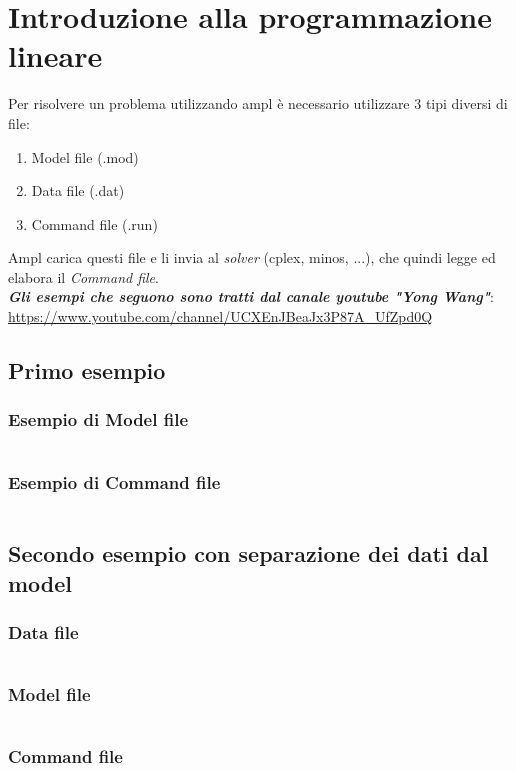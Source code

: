 \documentclass[\main/main.tex]{subfiles}
\begin{document}
%

\section{Introduzione alla programmazione lineare}
Per risolvere un problema utilizzando ampl è necessario utilizzare 3 tipi diversi di file:

\begin{enumerate}
\item Model file (.mod)
\item Data file (.dat)
\item Command file (.run)
\end{enumerate}

Ampl carica questi file e li invia al \textit{solver} (cplex, minos, ...), che quindi legge ed elabora il \textit{Command file}.
\\

\vspace{1em}
\textbf{\textit{Gli esempi che seguono sono tratti dal canale youtube "Yong Wang"}}: \url{https://www.youtube.com/channel/UCXEnJBeaJx3P87A_UfZpd0Q}

\subsection{Primo esempio}

\subsubsection{Esempio di Model file}
\inputminted{ampl}{\main/chapters/ampl/es1/example1.mod}

\subsubsection{Esempio di Command file}
\inputminted{ampl}{\main/chapters/ampl/es1/example1.run}

\subsection{Secondo esempio con separazione dei dati dal model}
\subsubsection{Data file}
\inputminted{ampl}{\main/chapters/ampl/es2/example2.dat}
\subsubsection{Model file}
\inputminted{ampl}{\main/chapters/ampl/es2/example2.mod}
\subsubsection{Command file}
\inputminted{ampl}{\main/chapters/ampl/es2/example2.run}
\end{document}
